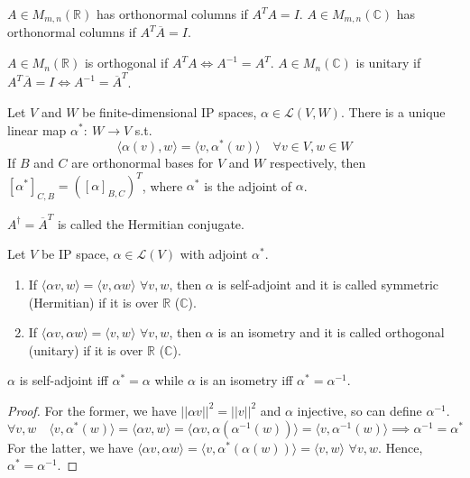 \documentclass[a4paper]{article}
\begin{document}
\begin{defi}
$A\in M_{m,n}(\mathbb{R})$ has orthonormal columns if $A^TA=I$. $A\in M_{m,n}(\mathbb{C})$ has orthonormal columns if $A^T\overline{A}=I$.
\end{defi}
\begin{defi}
$A\in M_n(\mathbb{R})$ is orthogonal if $A^TA\iff A^{-1}=A^T$. $A\in M_n(\mathbb{C})$ is unitary if $A^T\overline{A}=I\iff A^{-1}=\overline{A}^T$.
\end{defi}
\begin{prop}
Let $V$ and $W$ be finite-dimensional IP spaces, $\alpha\in\mathcal{L}(V,W)$. There is a unique linear map $\alpha^*:~W\rightarrow V$ s.t.
$$\langle\alpha(v),w\rangle=\langle v,\alpha^*(w)\rangle\quad\forall v\in V, w\in W$$
If $B$ and $C$ are orthonormal bases for $V$ and $W$ respectively, then $[\alpha^*]_{C,B}=([\alpha]_{B,C})^T$, where $\alpha^*$ is the adjoint of $\alpha$.
\end{prop}
\begin{defi}
$A^\dag=\overline{A}^T$ is called the Hermitian conjugate.
\end{defi}
\begin{defi}
Let $V$ be IP space, $\alpha\in\mathcal{L}(V)$ with adjoint $\alpha^*$. 
\begin{enumerate}
    \item If $\langle\alpha v,w\rangle=\langle v,\alpha w\rangle$ $\forall v,w$, then $\alpha$ is self-adjoint and it is called symmetric (Hermitian) if it is over $\mathbb{R}$ ($\mathbb{C}$).
    \item If $\langle\alpha v,\alpha w\rangle=\langle v,w\rangle$ $\forall v,w$, then $\alpha$ is an isometry and it is called orthogonal (unitary) if it is over $\mathbb{R}$ ($\mathbb{C}$).
\end{enumerate}
\end{defi}
\begin{thm}
$\alpha$ is self-adjoint iff $\alpha^*=\alpha$ while $\alpha$ is an isometry iff $\alpha^*=\alpha^{-1}$.
\end{thm}
\begin{proof}
For the former, we have $||\alpha v||^2=||v||^2$ and $\alpha$ injective, so can define $\alpha^{-1}$. 
$$\forall v,w\quad\langle v,\alpha^*(w)\rangle=\langle\alpha v,w\rangle=\langle\alpha v,\alpha(\alpha^{-1}(w))\rangle=\langle v,\alpha^{-1}(w)\rangle\implies\alpha^{-1}=\alpha^*$$
For the latter, we have $\langle\alpha v,\alpha w\rangle=\langle v,\alpha^*(\alpha(w))\rangle=\langle v,w\rangle$ $\forall v,w$. Hence, $\alpha^*=\alpha^{-1}$.
\end{proof}
\end{document}
